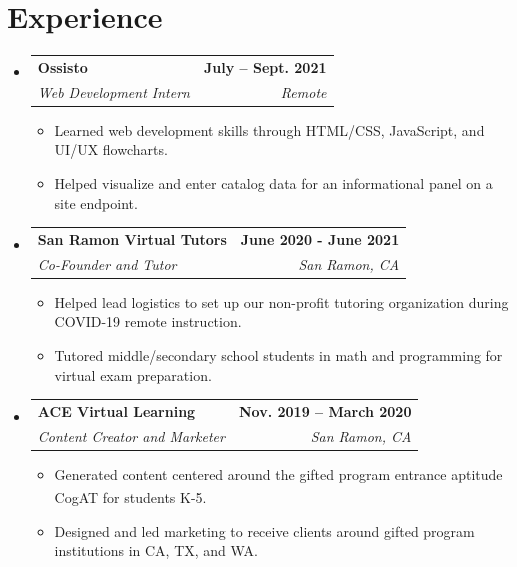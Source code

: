 \documentclass[letterpaper,11pt]{article}
\makeatletter
\newcommand{\resumeItem}[1]{
  \item\small{
    {#1 \vspace{-2pt}}
  }
}
\newcommand{\resumeSubheading}[4]{
  \vspace{-2pt}\item
    \begin{tabular*}{1.0\textwidth}[t]{l@{\extracolsep{\fill}}r}
      \textbf{#1} & \textbf{\small #2} \\
      \textit{\small#3} & \textit{\small #4} \\
    \end{tabular*}\vspace{-7pt}
}
\newcommand{\resumeSubHeadingListStart}{\begin{itemize}[leftmargin=0.0in, label={}]}
\newcommand{\resumeSubHeadingListEnd}{\end{itemize}}
\newcommand{\resumeItemListStart}{\begin{itemize}}
\newcommand{\resumeItemListEnd}{\end{itemize}\vspace{-5pt}}
\makeatother
\begin{document}
\section{Experience}
\resumeSubHeadingListStart

\resumeSubheading
{Ossisto}{July -- Sept. 2021}
{Web Development Intern}{Remote}
\resumeItemListStart
\resumeItem{Learned web development skills through HTML/CSS, JavaScript, and UI/UX flowcharts.}
\resumeItem{Helped visualize and enter catalog data for an informational panel on a site endpoint.}
\resumeItemListEnd

\resumeSubheading
{San Ramon Virtual Tutors}{June 2020 - June 2021}
{Co-Founder and Tutor}{San Ramon, CA}
\resumeItemListStart
\resumeItem{Helped lead logistics to set up our non-profit tutoring organization during COVID-19 remote instruction.}
\resumeItem{Tutored middle/secondary school students in math and programming for virtual exam preparation.}
\resumeItemListEnd

\resumeSubheading
{ACE Virtual Learning}{Nov. 2019 -- March 2020}
{Content Creator and Marketer}{San Ramon, CA}
\resumeItemListStart
\resumeItem{Generated content centered around the gifted program entrance aptitude CogAT\textsuperscript{\textregistered} for students K-5.}
\resumeItem{Designed and led marketing to receive clients around gifted program institutions in CA, TX, and WA.}
\resumeItemListEnd

\resumeSubHeadingListEnd
\vspace{-15pt}

\end{document}
